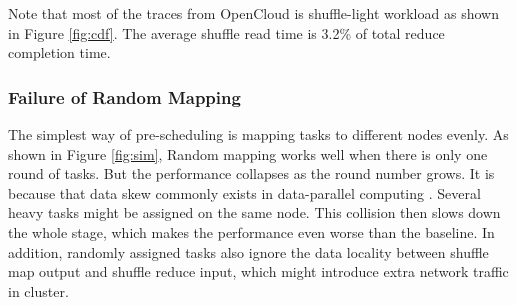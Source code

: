 


Note that most of the traces from OpenCloud is shuffle-light workload as shown in Figure \ref{fig:cdf}. The average shuffle read time is 3.2\% of total reduce completion time.

\subsubsection{Failure of Random Mapping}\label{randomassign}
The simplest way of pre-scheduling is mapping tasks to different nodes evenly.  As shown in Figure \ref{fig:sim}, Random mapping works well when there is only one round of tasks. But the performance collapses as the round number grows. It is because that data skew commonly exists in data-parallel computing \cite{skewtune, reining, gufler2012load}. Several heavy tasks might be assigned on the same node. This collision then slows down the whole stage, which makes the performance even worse than the baseline. In addition, randomly assigned tasks also ignore the data locality between shuffle map output and shuffle reduce input, which might introduce extra network traffic in cluster.


